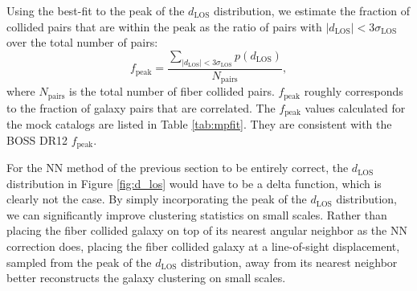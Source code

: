 
Using the best-fit to the peak of the $d_{\mathrm{LOS}}$ distribution, 
we estimate the fraction of collided pairs that are within the peak as 
the ratio of pairs with $|d_\mathrm{LOS}| < 3\sigma_\mathrm{LOS}$ 
over the total number of pairs:  
\begin{equation} \label{eq:fpeak}
f_{\mathrm{peak}} = \frac{\sum\limits_{|d_\mathrm{LOS}| < 3 \sigma_\mathrm{LOS}} p(d_{\mathrm{LOS}})}{N_{\mathrm{pairs}}}, 
\end{equation}
where $N_{\mathrm{pairs}}$ is the total number of fiber collided pairs. 
$f_\mathrm{peak}$ roughly corresponds to the fraction of galaxy pairs that are 
correlated. The $f_{\mathrm{peak}}$ values calculated for the mock catalogs are
listed in Table \ref{tab:mpfit}. They are consistent with the BOSS DR12 $f_\mathrm{peak}$. 

For the NN method of the previous section to be entirely correct, 
the $d_{\mathrm{LOS}}$ distribution in Figure \ref{fig:d_los} would 
have to be a delta function, which is clearly not the case. By simply 
incorporating the peak of the $d_{\mathrm{LOS}}$ distribution, we 
can significantly improve clustering statistics on small scales. Rather 
than placing the fiber collided galaxy on top of its nearest angular 
neighbor as the NN correction does, placing the fiber collided galaxy at a 
line-of-sight displacement, sampled from the peak of the $d_{\mathrm{LOS}}$
distribution, away from its nearest neighbor better reconstructs the 
galaxy clustering on small scales. 


